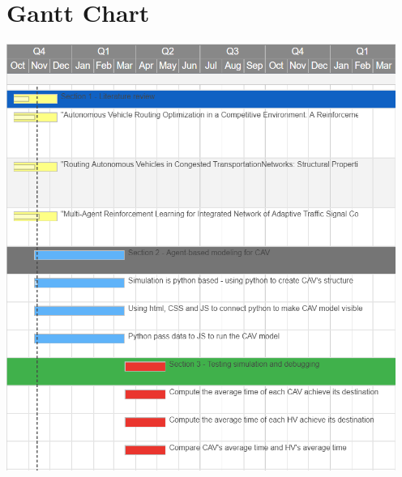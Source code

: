 \documentclass[10pt,letterpaper,draftclsnofoot,onecolumn]{IEEEtran}
\begin{document}
\section{Gantt Chart}
\includegraphics[width=5in]{gantt_chart}
\end{document}
